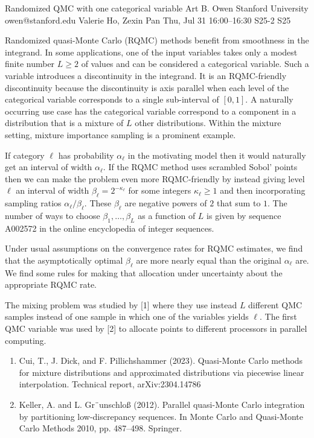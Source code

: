 \documentclass[12pt,lettersize,oneside]{book} %
\begin{document}
\begin{talk}
  {Randomized QMC with one categorical variable}%
  {Art B. Owen}%
  {Stanford University}%
  {owen@stanford.edu}%
  {Valerie Ho, Zexin Pan}%
  {}%
  {Thu, Jul 31 16:00--16:30}%
  {S25-2}%
  {S25}%
  
    
   
  Randomized quasi-Monte Carlo (RQMC) methods benefit from smoothness
  in the integrand.  In some applications, one of the input variables takes
  only a modest finite number $L\geqslant2$
of values and can be considered a categorical
  variable. Such a variable introduces a discontinuity in the integrand.  It is
  an RQMC-friendly discontinuity because the discontinuity is axis parallel
  when each level of the categorical variable corresponds to a single
  sub-interval of $[0,1]$.  A naturally occurring use case has
  the categorical variable correspond to a component in a distribution
  that is a mixture of $L$ other distributions.  Within the mixture
  setting, mixture importance sampling is a prominent example.

 If category $\ell$  has probability $\alpha_\ell$ in the motivating
  model then it would naturally get an interval of width $\alpha_\ell$.
If the RQMC method uses scrambled Sobol' points
then we can make the problem even more RQMC-friendly by instead giving
  level $\ell$ an interval of width $\beta_\ell = 2^{-\kappa_\ell}$
  for some integers $\kappa_\ell \geqslant1$ and then
  incorporating sampling ratios $\alpha_\ell/\beta_\ell$.
  These $\beta_\ell$ are negative powers of $2$ that sum to $1$.
  The number of ways to choose $\beta_1,\dots,\beta_L$
  as a function of $L$ is given by sequence A002572 in the
  online encyclopedia of integer sequences.

  Under usual assumptions on the convergence rates for RQMC
  estimates, we find that the asymptotically optimal $\beta_\ell$
  are more nearly equal than the original $\alpha_\ell$ are.
  We find some rules for making that  allocation under uncertainty
  about the appropriate RQMC rate.

  The mixing problem was studied by [1] where they use instead
  $L$ different QMC samples instead of one sample in which
  one of the variables yields $\ell$. The first QMC variable
  was used by [2] to allocate points to different processors
  in parallel computing.

\medskip
\begin{enumerate}
 \item[{[1]}] Cui, T., J. Dick, and F. Pillichshammer (2023). Quasi-Monte Carlo methods
for mixture distributions and approximated distributions via piecewise linear
interpolation. Technical report, arXiv:2304.14786 
\item[{[2]}]
Keller, A. and L. Gr¨unschlo{\ss} (2012). Parallel quasi-Monte Carlo integration by
partitioning low-discrepancy sequences. In Monte Carlo and Quasi-Monte
Carlo Methods 2010, pp. 487--498. Springer.
\end{enumerate}

\end{talk}
\end{document}
